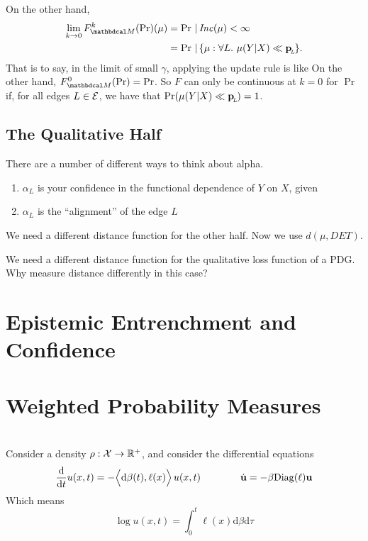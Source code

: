 \documentclass{article}
\begin{document}
On the other hand,
\begin{align*}
    \lim_{k \to 0} F_{\dg M}^k(\Pr)(\mu) &= \Pr \,|\, \Inc(\mu) < \infty \\
        &= \Pr \,|\, \{\mu : \forall L.~\mu(Y|X) \ll \bp \}.
\end{align*}
That is to say, in the limit of small $\gamma$, applying the update rule is like 
On the other hand, $F_{\dg M}^0(\Pr) = \Pr$. So $F$ can only be continuous at $k=0$ for $\Pr$ if, for all edges $L \in \mathcal E$, we have that $\Pr(\mu(Y|X) \ll \mathbf{p}_{\!_{L}\!}) = 1$.




\subsection{The Qualitative Half}


There are a number of different ways to think about alpha.
\begin{enumerate}[nosep]
    \item $\alpha_L$ is your confidence in the functional dependence of $Y$ on $X$, given 
    \item $\alpha_L$ is the ``alignment'' of the edge $L$
\end{enumerate}

We need a different distance function for the other half. Now we use
$d(\mu, DET)$.

% 

We need a different distance function for the qualitative loss function of a PDG.
Why measure distance differently in this case?


\section{Epistemic Entrenchment and Confidence}
\section{Weighted Probability Measures}

\newpage
\section{}
Consider a density $\rho : \mathcal X \to \mathbb R^+$, and consider the differential equations
\[
    \frac{\mathrm d}{\mathrm d t} u(x,t) 
    = - \Big\langle\mathrm d\beta(t), \ell(x) \Big\rangle
        \,
        {u(x,t)}
    \qquad\qquad%
    \dot {\mat u} = - \beta \mathrm{Diag}(\ell) \mat u
\]
Which means
\[ 
        \log u (x,t)
    = \int_{0}^{t}  \ell(x) \mathrm d \beta \mathrm d \tau
\]
\end{document}
